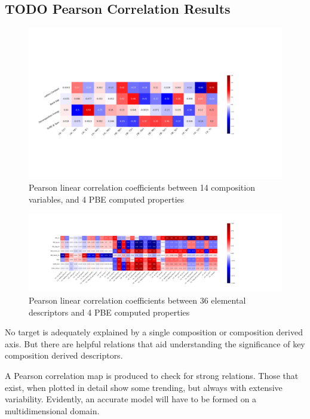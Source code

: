 \documentclass[twoside, twocolumn, 9pt, draft]{article}
\begin{document}
\subsection*{{\bfseries\sffamily TODO} Pearson Correlation Results}
\label{sec:org4f22c68}
\begin{figure}
\centering
\includegraphics[width=.9\linewidth]{PBE_v_comp_pearson2.png}
\caption{\label{fig:pearson_pcomp} Pearson linear correlation coefficients between 14 composition variables, and 4 PBE computed properties}
\end{figure}

\begin{figure}
\centering
\includegraphics[width=.9\linewidth]{PBE_v_site_prop_pearson.png}
\caption{\label{fig:pearson_psite} Pearson linear correlation coefficients between 36 elemental descriptors and 4 PBE computed properties}
\end{figure}

No target is adequately explained by a single composition or
composition derived axis. But there are helpful relations that aid
understanding the significance of key composition derived descriptors.

A Pearson correlation map is produced to check for strong
relations. Those that exist, when plotted in detail show some
trending, but always with extensive variability. Evidently, an
accurate model will have to be formed on a multidimensional domain.
\end{document}
